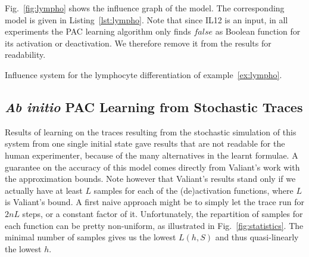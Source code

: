 \documentclass{llncs}
\begin{document}
Fig.~\ref{fig:lympho} shows the influence graph of the model. The
corresponding model is given in Listing~\ref{lst:lympho}.
Note that since IL12 is an input, in all experiments the PAC learning
algorithm only finds $false$ as Boolean function for its activation or
deactivation. We therefore remove it from the results for readability.

\begin{listfig}[htb]
   
   \caption{Influence system for the lymphocyte differentiation of
   example~\ref{ex:lympho}.}\label{lst:lympho}
\end{listfig}

\subsection{\emph{Ab initio} PAC Learning from Stochastic Traces}
\label{sec:abinitio}

Results of learning on the traces resulting from the stochastic simulation of
this system from one single initial state gave results that are not
readable for the human experimenter, because of the many alternatives in the
learnt formulae. A guarantee on the accuracy of this model comes directly
from Valiant's work with the approximation bounds. Note however that
Valiant's results stand only if we actually have
at least $L$ samples for each of the (de)activation functions, where $L$ is
Valiant's bound. A first naive approach might be to simply let the trace run
for $2nL$ steps, or a constant factor of it. Unfortunately, the repartition of
samples for each function can be pretty non-uniform, as illustrated in
Fig.~\ref{fig:statistics}. The minimal number of samples gives us the lowest
$L(h, S)$ and thus quasi-linearly the lowest $h$.
\end{document}
